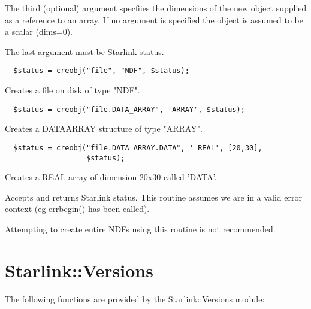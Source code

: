 \documentclass[twoside,11pt]{article}
\renewcommand{\_}{\texttt{\symbol{95}}}
\begin{document}
\begin{description}
The third (optional) argument specfiies the dimensions of the new
object supplied as a reference to an array. If no argument is
specified the object is assumed to be a scalar (dims=0).



The last argument must be Starlink status.

\begin{verbatim}
  $status = creobj("file", "NDF", $status);
\end{verbatim}


Creates a file on disk of type "NDF".

\begin{verbatim}
  $status = creobj("file.DATA_ARRAY", 'ARRAY', $status);
\end{verbatim}


Creates a DATA\_ARRAY structure of type "ARRAY".

\begin{verbatim}
  $status = creobj("file.DATA_ARRAY.DATA", '_REAL', [20,30],
                   $status);
\end{verbatim}


Creates a REAL array of dimension 20x30 called 'DATA'.



Accepts and returns Starlink status. This routine assumes we are in a
valid error context (eg err\_begin() has been called).



Attempting to create entire NDFs using this routine is not recommended.

\end{description}

\section{Starlink::Versions\label{Starlink::Versions}}


The following functions are provided by the Starlink::Versions module:
\end{document}
